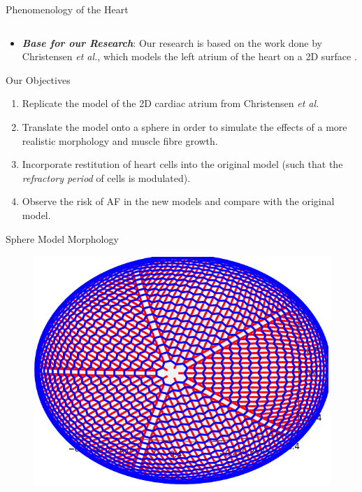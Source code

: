 \documentclass[final,hyperref={pdfpagelabels=false}]{beamer}
\begin{document}
\begin{frame}[t]
\begin{columns}[t]
\begin{column}{.465\textwidth}
\begin{block}{Phenomenology of the Heart}
\begin{columns}
\begin{column}{.54\textwidth}
	
	
\end{column}

\end{columns}

	\begin{itemize}
	
	
 \item \textbf{\textit{Base for our Research}}: Our research is based on the work done by Christensen \emph{et al.}, which models the left atrium of the heart on a 2D surface \cite{Christensen}.
	\end{itemize}
\end{block}
\begin{block}{Our Objectives}

\begin{enumerate}
\item Replicate the model of the 2D cardiac atrium from Christensen \emph{et al.}
\item  Translate the model onto a sphere in order to simulate the effects of a more realistic morphology and muscle fibre growth. 
\item Incorporate restitution of heart cells into the original model (such that the \textit{refractory period} of cells is modulated).
\item Observe the risk of AF in the new models and compare with the original model.
\end{enumerate}


\end{block}


\begin{block}{Sphere Model Morphology}

\begin{figure}

\begin{columns}
\begin{column}{.67\textwidth}
\includegraphics[width=0.8\linewidth]{connectome}


\end{column}
\end{columns}
\end{figure}
\end{block}
\end{column}
\end{columns}
\end{frame}
\end{document}
